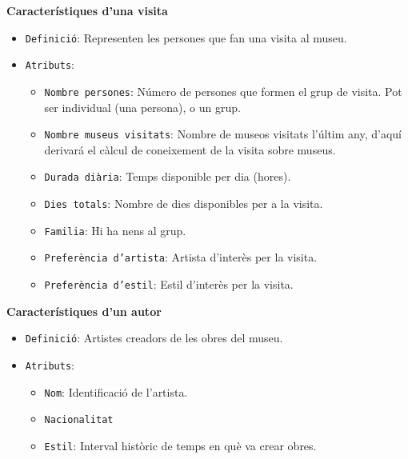 \documentclass[a4paper]{article}
\begin{document}
	\noindent \textbf{Característiques d'una visita}
	\begin{itemize}
		\item \texttt{Definició}: Representen les persones que fan una visita al museu.
		\item \texttt{Atributs}:
		\begin{itemize}
			\item \texttt{Nombre persones}: Número de persones que formen el grup de visita. Pot ser individual (una persona), o un grup.
			\item \texttt{Nombre museus visitats}: Nombre de museos visitats l'últim any, d'aquí derivará el càlcul de coneixement de la visita sobre museus.
			\item \texttt{Durada diària}: Temps disponible per dia (hores).
			\item \texttt{Dies totals}: Nombre de dies disponibles per a la visita.
			\item \texttt{Familia}: Hi ha nens al grup.
			\item \texttt{Preferència d'artista}: Artista d'interès per la visita.
			\item \texttt{Preferència d'estil}: Estil d'interès per la visita.
		\end{itemize}
	\end{itemize}
		
		
	\noindent \textbf{Característiques d'un autor}
	\begin{itemize}
		\item \texttt{Definició}: Artistes creadors de les obres del museu.
		\item \texttt{Atributs}:
		\begin{itemize}
			\item \texttt{Nom}: Identificació de l’artista.
			\item \texttt{Nacionalitat}
			\item \texttt{Estil}: Interval històric de temps en què va crear obres.
			
		\end{itemize}
	\end{itemize}
	
\end{document}
